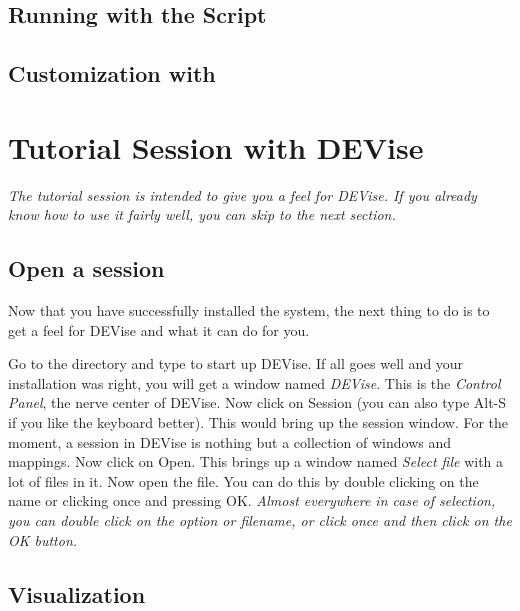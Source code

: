 \subsection{Running with the  Script}

\subsection{Customization with }

\section{Tutorial Session with DEVise}

{\em The tutorial session is intended to give you a feel for
DEVise. If you already know how to use it fairly well, you can skip
to the next section.}

\subsection{Open a session}
	
Now that you have successfully installed the system, the next thing
to do is to get a feel for DEVise and what it can do for you.

Go to the  directory and type  to start
up DEVise. If all goes well and your installation was right, you will
get a window named {\em DEVise}. This is the {\em Control Panel}, the
nerve center of DEVise. Now click on Session (you can also type Alt-S
if you like the keyboard better). This would bring up the session
window. For the moment, a session in DEVise is nothing but a
collection of windows and mappings. Now click on Open. This brings up
a window named {\em Select file} with a lot of  files in
it. Now open the  file. You can do this by double
clicking on the  name or clicking once and pressing
OK. {\em Almost everywhere in case of selection, you can double click
on the option or filename, or click once and then click on the OK
button.}


\subsection{Visualization}

